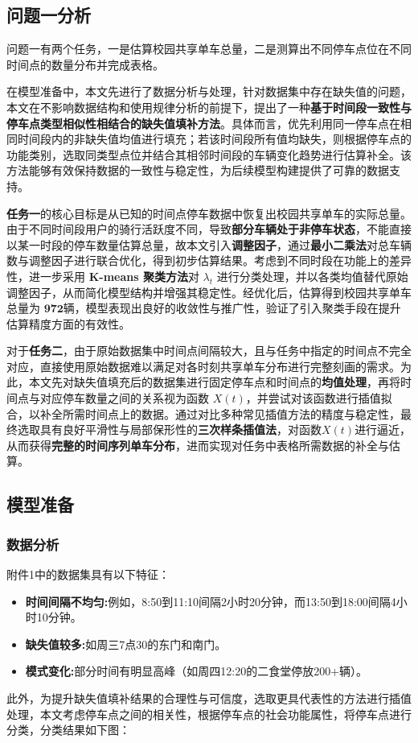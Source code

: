 \documentclass[withoutpreface,bwprint]{cumcmthesis}
\begin{document}
\subsection{问题一分析}
问题一有两个任务，一是估算校园共享单车总量，二是测算出不同停车点位在不同时间点的数量分布并完成表格。

在模型准备中，本文先进行了数据分析与处理，针对数据集中存在缺失值的问题，本文在不影响数据结构和使用规律分析的前提下，提出了一种\textbf{基于时间段一致性与停车点类型相似性相结合的缺失值填补方法}。具体而言，优先利用同一停车点在相同时间段内的非缺失值均值进行填充；若该时间段所有值均缺失，则根据停车点的功能类别，选取同类型点位并结合其相邻时间段的车辆变化趋势进行估算补全。该方法能够有效保持数据的一致性与稳定性，为后续模型构建提供了可靠的数据支持。

\textbf{任务一}的核心目标是从已知的时间点停车数据中恢复出校园共享单车的实际总量。由于不同时间段用户的骑行活跃度不同，导致\textbf{部分车辆处于非停车状态}，不能直接以某一时段的停车数量估算总量，故本文引入\textbf{调整因子}，通过\textbf{最小二乘法}对总车辆数与调整因子进行联合优化，得到初步估算结果。考虑到不同时段在功能上的差异性，进一步采用 \textbf{K-means 聚类方法}对 $\lambda_t$ 进行分类处理，并以各类均值替代原始调整因子，从而简化模型结构并增强其稳定性。经优化后，估算得到校园共享单车总量为 $\textbf{972}$辆，模型表现出良好的收敛性与推广性，验证了引入聚类手段在提升估算精度方面的有效性。

对于\textbf{任务二}，由于原始数据集中时间点间隔较大，且与任务中指定的时间点不完全对应，直接使用原始数据难以满足对各时刻共享单车分布进行完整刻画的需求。为此，本文先对缺失值填充后的数据集进行固定停车点和时间点的\textbf{均值处理}，再将时间点与对应停车数量之间的关系视为函数 $X(t)$，并尝试对该函数进行插值拟合，以补全所需时间点上的数据。通过对比多种常见插值方法的精度与稳定性，最终选取具有良好平滑性与局部保形性的\textbf{三次样条插值法}，对函数$X(t)$进行逼近，从而获得\textbf{完整的时间序列单车分布}，进而实现对任务中表格所需数据的补全与估算。
\subsection{模型准备}
\subsubsection{数据分析}
\label{subsec:缺失值}
附件1中的数据集具有以下特征：
\begin{itemize}
    \item \textbf{时间间隔不均匀:}例如，8:50到11:10间隔2小时20分钟，而13:50到18:00间隔4小时10分钟。
    \item \textbf{缺失值较多:}如周三7点30的东门和南门。
    \item \textbf{模式变化:}部分时间有明显高峰（如周四12:20的二食堂停放200+辆）。
\end{itemize}\par
此外，为提升缺失值填补结果的合理性与可信度，选取更具代表性的方法进行插值处理，本文考虑停车点之间的相关性，根据停车点的社会功能属性，将停车点进行分类，分类结果如下图：
\end{document}
